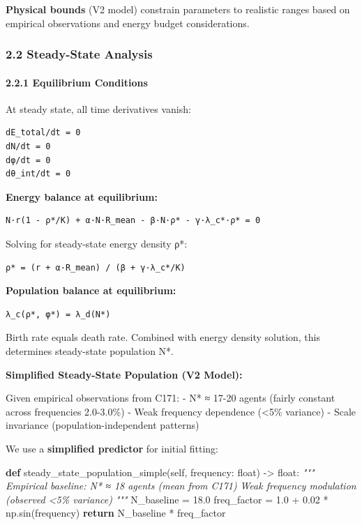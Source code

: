 \documentclass[
]{article}
\newenvironment{Shaded}{}{}
\newcommand{\BuiltInTok}[1]{\textcolor[rgb]{0.00,0.50,0.00}{#1}}
\newcommand{\CommentTok}[1]{\textcolor[rgb]{0.38,0.63,0.69}{\textit{#1}}}
\newcommand{\ControlFlowTok}[1]{\textcolor[rgb]{0.00,0.44,0.13}{\textbf{#1}}}
\newcommand{\FloatTok}[1]{\textcolor[rgb]{0.25,0.63,0.44}{#1}}
\newcommand{\KeywordTok}[1]{\textcolor[rgb]{0.00,0.44,0.13}{\textbf{#1}}}
\newcommand{\NormalTok}[1]{#1}
\newcommand{\OperatorTok}[1]{\textcolor[rgb]{0.40,0.40,0.40}{#1}}
\newcommand{\VariableTok}[1]{\textcolor[rgb]{0.10,0.09,0.49}{#1}}
\begin{document}
\textbf{Physical bounds} (V2 model) constrain parameters to realistic
ranges based on empirical observations and energy budget considerations.

\subsubsection{2.2 Steady-State Analysis}\label{steady-state-analysis}

\paragraph{2.2.1 Equilibrium Conditions}\label{equilibrium-conditions}

At steady state, all time derivatives vanish:

\begin{verbatim}
dE_total/dt = 0
dN/dt = 0
dφ/dt = 0
dθ_int/dt = 0
\end{verbatim}

\textbf{Energy balance at equilibrium:}

\begin{verbatim}
N·r(1 - ρ*/K) + α·N·R_mean - β·N·ρ* - γ·λ_c*·ρ* = 0
\end{verbatim}

Solving for steady-state energy density ρ*:

\begin{verbatim}
ρ* = (r + α·R_mean) / (β + γ·λ_c*/K)
\end{verbatim}

\textbf{Population balance at equilibrium:}

\begin{verbatim}
λ_c(ρ*, φ*) = λ_d(N*)
\end{verbatim}

Birth rate equals death rate. Combined with energy density solution,
this determines steady-state population N*.

\textbf{Simplified Steady-State Population (V2 Model):}

Given empirical observations from C171: - N* ≈ 17-20 agents (fairly
constant across frequencies 2.0-3.0\%) - Weak frequency dependence
(\textless5\% variance) - Scale invariance (population-independent
patterns)

We use a \textbf{simplified predictor} for initial fitting:

\begin{Shaded}
\begin{Highlighting}[]
\KeywordTok{def}\NormalTok{ steady\_state\_population\_simple(}\VariableTok{self}\NormalTok{, frequency: }\BuiltInTok{float}\NormalTok{) }\OperatorTok{{-}\textgreater{}} \BuiltInTok{float}\NormalTok{:}
    \CommentTok{"""}
\CommentTok{    Empirical baseline: N* ≈ 18 agents (mean from C171)}
\CommentTok{    Weak frequency modulation (observed \textless{}5\% variance)}
\CommentTok{    """}
\NormalTok{    N\_baseline }\OperatorTok{=} \FloatTok{18.0}
\NormalTok{    freq\_factor }\OperatorTok{=} \FloatTok{1.0} \OperatorTok{+} \FloatTok{0.02} \OperatorTok{*}\NormalTok{ np.sin(frequency)}
    \ControlFlowTok{return}\NormalTok{ N\_baseline }\OperatorTok{*}\NormalTok{ freq\_factor}
\end{Highlighting}
\end{Shaded}
\end{document}
